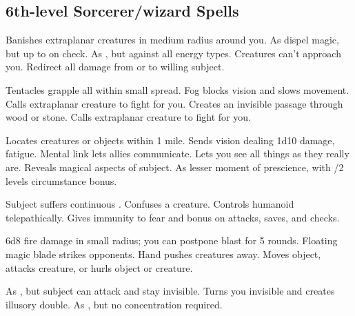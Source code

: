 \subsection{6th-level Sorcerer/wizard Spells} 
\begin{swspelllist}
 Banishes extraplanar creatures in medium radius around you.
 As dispel magic, but up to  on check.
 As , but against all energy types.
 Creatures can't approach you.
 Redirect all damage from or to willing subject.

 Tentacles grapple all within small spread.
 Fog blocks vision and slows movement.
 Calls extraplanar creature to fight for you.
 Creates an invisible passage through wood or stone.
 Calls extraplanar creature to fight for you.

 Locates creatures or objects within 1 mile.
 Sends vision dealing 1d10 damage, fatigue.
 Mental link lets allies communicate.
\M Lets you see all things as they really are.
\F Reveals magical aspects of subject.
 As lesser moment of prescience, with /2 levels circumstance bonus.

 Subject suffers continuous .
 Confuses a creature.
 Controls humanoid telepathically.
 Gives immunity to fear and bonus on attacks, saves, and checks.

 6d8 fire damage in small radius; you can postpone blast for 5 rounds.
\F Floating magic blade strikes opponents.
 Hand pushes creatures away.
 Moves object, attacks creature, or hurls object or creature.

 As , but subject can attack and stay invisible.
 Turns you invisible and creates illusory double.
 As , but no concentration required.
\spellheadrestricted{}


\end{swspelllist}
